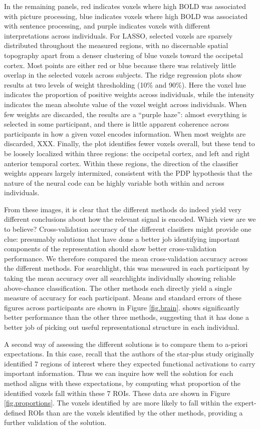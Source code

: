 In the remaining panels, red indicates voxels where high BOLD was associated with picture processing, blue indicates voxels where high BOLD was associated with sentence processing, and purple indicates voxels with different interpretations across individuals. For LASSO, selected voxels are sparsely distributed throughout the measured regions, with no discernable spatial topography apart from a denser clustering of blue voxels toward the occipetal cortex. Most points are either red or blue because there was relatively little overlap in the selected voxels across subjects. The ridge regression plots show results at two levels of weight thresholding (10\% and 90\%). Here the voxel hue indicates the proportion of positive weights across individuals, while the intensity indicates the mean absolute value of the voxel weight across individuals. When few weights are discarded, the results are a ``purple haze'': almost everything is selected in some participant, and there is little apparent coherence across participants in how a given voxel encodes information. When most weights are discarded, XXX. Finally, the \soslasso plot identifies fewer voxels overall, but these tend to be loosely localized within three regions: the occipetal cortex, and left and right anterior temporal cortex. Within these regions, the direction of the classifier weights appears largely intermixed, consistent with the PDP hypothesis that the nature of the neural code can be highly variable both within and across individuals.

From these images, it is clear that the different methods do indeed yield very different conclusions about how the relevant signal is encoded. Which view are we to believe? Cross-validation accuracy of the different clasifiers might provide one clue: presumably solutions that have done a better job identifying important components of the representation should show better cross-validation performance. We therefore compared the mean cross-validation accuracy across the different methods. For searchlight, this was measured in each participant by taking the mean accuracy over all searchlights individually showing reliable above-chance classification. The other methods each directly yield a single measure of accuracy for each participant. Means and standard errors of these figures across participants are shown in Figure \ref{fig.brain}. \soslasso shows significantly better performance than the other three methods, suggesting that it has done a better job of picking out useful representational structure in each individual.

A second way of assessing the different solutions is to compare them to a-priori expectations. In this case, recall that the authors of the star-plus study originally identified 7 regions of interest where they expected functional activations to carry important information. Thus we can inquire how well the solution for each method aligns with these expectations, by computing what proportion of the identified voxels fall within these 7 ROIs. These data are shown in Figure \ref{fig.proportions}. The voxels identified by \soslasso are more likely to fall within the expert-defined ROIs than are the voxels identified by the other methods, providing a further validation of the \soslasso solution.
